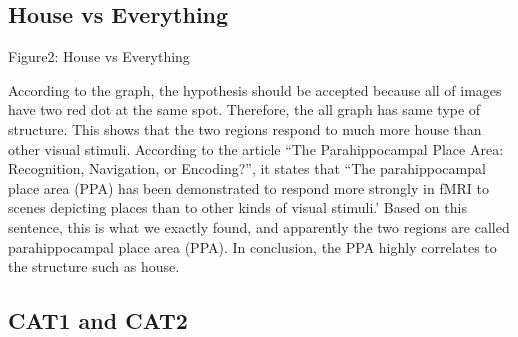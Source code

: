 \documentclass[11pt]{article}
\begin{document}
\subsection{House vs Everything}

\begin{housevsface}
  \centering
    \caption{Figure2: House vs Everything}
           
           
According to the graph, the hypothesis should be accepted because all of images have two red dot at the same spot. Therefore, the all graph has same type of structure. This shows that the two regions respond to much more house than other visual stimuli. According to the article “The Parahippocampal Place Area: Recognition, Navigation, or Encoding?”, it states that “The parahippocampal place area (PPA) has been demonstrated to respond more strongly in fMRI to scenes depicting places than to other kinds of visual stimuli.’ Based on this sentence, this is what we exactly found, and apparently the two regions are called parahippocampal place area (PPA). In conclusion, the PPA highly correlates to the structure such as house.
\end{housevsface}


\subsection{CAT1 and CAT2}
\end{document}
